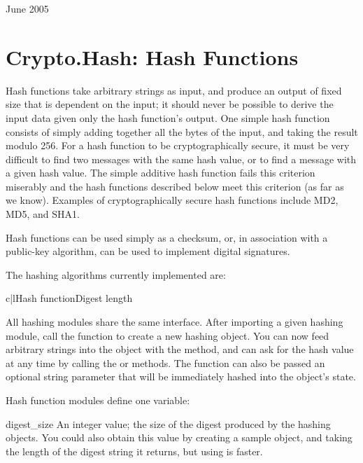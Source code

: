 \documentclass{howto}
\begin{document}
June 2005


\section{Crypto.Hash: Hash Functions}

Hash functions take arbitrary strings as input, and produce an output
of fixed size that is dependent on the input; it should never be
possible to derive the input data given only the hash function's
output.  One simple hash function consists of simply adding together
all the bytes of the input, and taking the result modulo 256.  For a
hash function to be cryptographically secure, it must be very
difficult to find two messages with the same hash value, or to find a
message with a given hash value.  The simple additive hash function
fails this criterion miserably and the hash functions described below
meet this criterion (as far as we know).  Examples of
cryptographically secure hash functions include MD2, MD5, and SHA1.

Hash functions can be used simply as a checksum, or, in association with a
public-key algorithm, can be used to implement digital signatures.

The hashing algorithms currently implemented are:

\begin{tableii}{c|l}{}{Hash function}{Digest length}
\end{tableii}

All hashing modules share the same interface.  After importing a given
hashing module, call the  function to create a new
hashing object. You can now feed arbitrary strings into the object
with the  method, and can ask for the hash value at
any time by calling the  or 
methods.  The  function can also be passed an optional
string parameter that will be immediately hashed into the object's
state.

Hash function modules define one variable:

\begin{datadesc}{digest_size}
An integer value; the size of the digest
produced by the hashing objects.  You could also obtain this value by
creating a sample object, and taking the length of the digest string
it returns, but using  is faster.
\end{datadesc}
\end{document}
